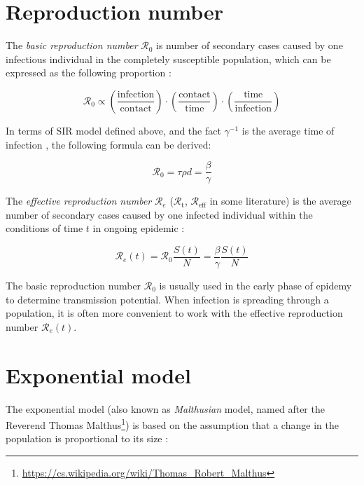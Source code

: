 \documentclass[
  digital, %
  oneside, %
  lof,     %
  lot,     %
]{fithesis4}
\begin{document}
\section{Reproduction number}

The \textit{basic reproduction number} $\mathcal{R}_0$ is number of secondary cases caused by one infectious individual in the completely susceptible population, which can be expressed as the following proportion \cite{jones2007}:

\begin{equation}
	\mathcal{R}_0 \propto \left(\frac{\text{infection}}{\text{contact}}\right)\cdot\left(\frac{\text{contact}}{\text{time}}\right)\cdot\left(\frac{\text{time}}{\text{infection}}\right)  
\end{equation}

In terms of SIR model defined above, and the fact $\gamma^{-1}$ is the average time of infection \cite{ma2019}, the following formula can be derived:

\begin{equation}
	\mathcal{R}_0 = \tau \rho d = \frac{\beta}{\gamma}
\end{equation}

The \textit{effective reproduction number} $\mathcal{R}_e$ ($\mathcal{R}_{\text{t}}$, $\mathcal{R}_{\text{eff}}$ in some literature) is the average number of secondary cases caused by one infected individual within the conditions of time $t$ in ongoing epidemic \cite{chowell2016}:

\begin{equation}
  \label{eq:sir-effective-reproduction-number}
	\mathcal{R}_e(t) = \mathcal{R}_0 \frac{S(t)}{N} = \frac{\beta}{\gamma} \frac{S(t)}{N}
\end{equation}

The basic reproduction number $\mathcal{R}_0$ is usually used in the early phase of epidemy to determine transmission potential.
When infection is spreading through a population, it is often more convenient to work with the effective reproduction number $\mathcal{R}_e(t)$.


\section{Exponential model}

The exponential model (also known as \textit{Malthusian} model, named after the Reverend Thomas Malthus\footnote{\url{https://cs.wikipedia.org/wiki/Thomas_Robert_Malthus}}) is based on the assumption that a change in the population is proportional to its size \cite{martcheva2015}:
\end{document}
